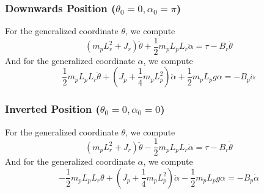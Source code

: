 \subsubsection*{Downwards Position (\( \theta_0=0, \alpha_0=\pi \))}
For the generalized coordinate \( \theta \), we compute
\[
    \left(m_p L_{r}^{2} + J_r\right) \ddot{\theta} + \frac{1}{2} m_p L_p L_r \ddot{\alpha} = \tau - B_r \dot{\theta}
\]
And for the generalized coordinate \( \alpha \), we compute
\[
    \frac{1}{2} m_p L_p L_r \ddot{\theta} + \left(J_p + \frac{1}{4} m_p L_{p}^{2}\right)\ddot{\alpha} + \frac{1}{2} m_p L_{p} g \alpha = - B_p \dot{\alpha}
\]

\subsubsection*{Inverted Position (\( \theta_0=0, \alpha_0=0 \))}
For the generalized coordinate \( \theta \), we compute
\[
    \left(m_p L_{r}^{2} + J_r\right) \ddot{\theta} - \frac{1}{2} m_p L_p L_r \ddot{\alpha} = \tau - B_r \dot{\theta}
\]
And for the generalized coordinate \( \alpha \), we compute
\[
    -\frac{1}{2} m_p L_p L_r \ddot{\theta} + \left(J_p + \frac{1}{4} m_p L_{p}^{2}\right)\ddot{\alpha} - \frac{1}{2} m_p L_{p} g \alpha = - B_p \dot{\alpha}
\]

